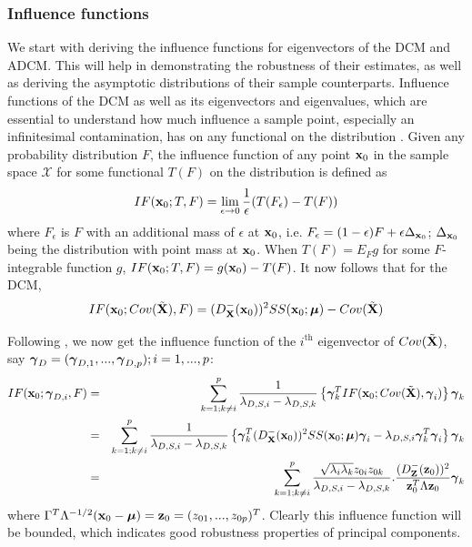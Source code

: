 \subsubsection{Influence functions}
We start with deriving the influence functions for eigenvectors of the DCM and ADCM. This will help in demonstrating the robustness of their estimates, as well as deriving the asymptotic distributions of their sample counterparts. Influence functions of the DCM as well as its eigenvectors and eigenvalues, which are essential to understand how much influence a sample point, especially an infinitesimal contamination, has on any functional on the distribution \citep{HampelBook86}. Given any probability distribution $F$, the influence function of any point ${\bf{x}}_0$ in the sample space $\mathcal{X}$ for some functional $T(F)$ on the distribution is defined as
%
$$ IF({\bf{x}}_0; T,F) = \lim_{\epsilon \rightarrow 0} \frac{1}{\epsilon} (T(F_\epsilon) - T(F)) $$
%
where $F_\epsilon$ is $F$ with an additional mass of $\epsilon$ at ${\bf{x}}_0$, i.e. $F_\epsilon = (1-\epsilon)F + \epsilon \Delta_{{\bf{x}}_0}$; $\Delta_{{\bf{x}}_0}$ being the distribution with point mass at ${\bf{x}}_0$. When $T(F) = E_F g$ for some $F$-integrable function $g$, $IF({\bf{x}}_0; T,F) = g({\bf{x}}_0) - T(F)$. It now follows that for the DCM,
%
$$ IF({\bf{x}}_0; Cov(\tilde {{\mathbf{X}}}), F) = (D^-_{\mathbf{X}}({\bf{x}}_0))^2 SS({\bf{x}}_0; {\boldsymbol{\mu}}) - Cov(\tilde {{\mathbf{X}}}) $$

Following \cite{croux00}, we now get the influence function of the $i^\text{th}$ eigenvector of $Cov(\tilde{{\mathbf{X}}})$, say ${\boldsymbol{\gamma}}_D = ({\boldsymbol{\gamma}}_{D,1},...,{\boldsymbol{\gamma}}_{D,p}); i = 1,...,p$:
%
\begin{eqnarray}
IF({\bf{x}}_0; {\boldsymbol{\gamma}}_{D,i}, F) &=& \sum_{k=1; k \neq i}^p \frac{1}{\lambda_{D,S,i} - \lambda_{D,S,k}} \left\{ {\boldsymbol{\gamma}}^T_k IF({\bf{x}}_0; Cov(\tilde {{\mathbf{X}}}), {\boldsymbol{\gamma}}_i) \right\} {\boldsymbol{\gamma}}_k \notag \\
&=& \sum_{k=1; k \neq i}^p \frac{1}{\lambda_{D,S,i} - \lambda_{D,S,k}} \left\{ {\boldsymbol{\gamma}}^T_k (D^-_{\mathbf{X}}({\bf{x}}_0))^2 SS({\bf{x}}_0; {\boldsymbol{\mu}}){\boldsymbol{\gamma}}_i - \lambda_{D,S,i}{\boldsymbol{\gamma}}_k^T{\boldsymbol{\gamma}}_i \right\} {\boldsymbol{\gamma}}_k \notag \\
&=& \sum_{k=1; k \neq i}^p \frac{\sqrt{\lambda_i \lambda_k} z_{0i} z_{0k}}{\lambda_{D,S,i} - \lambda_{D,S,k}}. \frac{(D^-_{\mathbf{Z}}({\bf{z}}_0))^2 }{{\bf{z}}_0^T \Lambda {\bf{z}}_0} {\boldsymbol{\gamma}}_k
\end{eqnarray}
%
where $\Gamma^T \Lambda^{-1/2} ({\bf{x}}_0 - {\boldsymbol{\mu}}) = {\bf{z}}_0 = (z_{01},...,z_{0p})^T$. Clearly this influence function will be bounded, which indicates good robustness properties of principal components.

